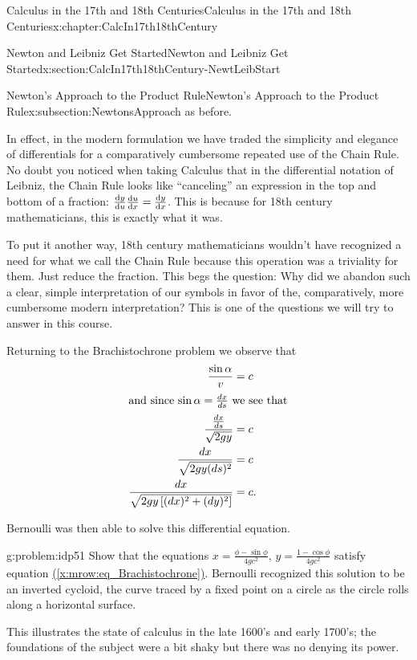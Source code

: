 \begin{chapterptx}{Calculus in the 17th and 18th Centuries}{}{Calculus in the 17th and 18th Centuries}{}{}{x:chapter:CalcIn17th18thCentury}
\begin{sectionptx}{Newton and Leibniz Get Started}{}{Newton and Leibniz Get Started}{}{}{x:section:CalcIn17th18thCentury-NewtLeibStart}
\begin{subsectionptx}{Newton's Approach to the Product Rule}{}{Newton's Approach to the Product Rule}{}{}{x:subsection:NewtonsApproach}
			as before.%
			\par
			In effect, in the modern formulation we have traded the simplicity and elegance of differentials for a comparatively cumbersome repeated use of the Chain Rule. No doubt you noticed when taking Calculus that in the differential notation of Leibniz, the Chain Rule looks like ``canceling'' an expression in the top and bottom of a fraction: \(\frac{\text{d}{y}}{\text{d}{u}}\frac{\text{d}{u}}{\text{d}{x}} = \frac{\text{d}{y}}{\text{d}{x}}\). This is because for 18th century mathematicians, this is exactly what it was.%
			\par
			To put it another way, 18th century mathematicians wouldn't have recognized a need for what we call the Chain Rule because this operation was a triviality for them. Just reduce the fraction. This begs the question: Why did we abandon such a clear, simple interpretation of our symbols in favor of the, comparatively, more cumbersome modern interpretation? This is one of the questions we will try to answer in this course.%
			\par
			Returning to the Brachistochrone problem we observe that%
			\begin{align}
				\frac{\sin\alpha}{v} & = c\notag\\
				\intertext{and since \(\sin\alpha = \frac{d x}{d s}\)   we see that}
				\frac{\frac{d x}{d s}}{\sqrt{2gy}} & = c\notag\\
				\frac{d x}{\sqrt{2gy(ds)^2}} & = c\notag\\
				\frac{d x}{\sqrt{2gy\left[(d x)^2+(d y)^2\right]}} & = c\text{.}\label{x:mrow:eq_Brachistochrone}
			\end{align}
			\par
			Bernoulli was then able to solve this differential equation.%
			\begin{problem}{}{g:problem:idp51}%
				 Show that the equations \(x=\frac{\phi-\sin \phi}{4gc^2},\,y=\frac{1-\cos \phi}{4gc^2}\) satisfy equation \hyperref[x:mrow:eq_Brachistochrone]{({\xreffont\ref{x:mrow:eq_Brachistochrone}})}. Bernoulli recognized this solution to be an inverted cycloid, the curve traced by a fixed point on a circle as the circle rolls along a horizontal surface.%
			\end{problem}
			This illustrates the state of calculus in the late 1600's and early 1700's; the foundations of the subject were a bit shaky but there was no denying its power.%
		\end{subsectionptx}
	\end{sectionptx}

\end{chapterptx}
